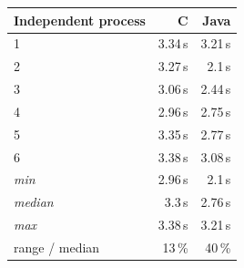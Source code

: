 \begin{tabular}{lrr}
\toprule
Independent process & C & Java \\
\midrule
1 & 3.34\,s & 3.21\,s \\
2 & 3.27\,s & 2.1\,s \\
3 & 3.06\,s & 2.44\,s \\
4 & 2.96\,s & 2.75\,s \\
5 & 3.35\,s & 2.77\,s \\
6 & 3.38\,s & 3.08\,s \\
\textit{min} & 2.96\,s & 2.1\,s \\
\textit{median} & 3.3\,s & 2.76\,s \\
\textit{max} & 3.38\,s & 3.21\,s \\
range / median & 13\,\% & 40\,\% \\
\bottomrule
\end{tabular}
